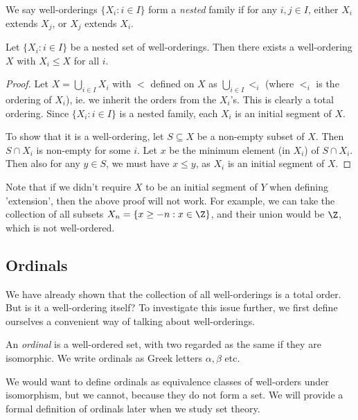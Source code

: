 \documentclass[a4paper]{article}
\begin{document}
\begin{defi}
  We say well-orderings $\{X_i: i\in I\}$ form a \emph{nested} family if for any $i, j\in I$, either $X_i$ extends $X_j$, or $X_j$ extends $X_i$.
\end{defi}

\begin{prop}
  Let $\{X_i: i\in I\}$ be a nested set of well-orderings. Then there exists a well-ordering $X$ with $X_i\leq X$ for all $i$.
\end{prop}

\begin{proof}
  Let $X = \bigcup_{i\in I}X_i$ with $<$ defined on $X$ as $\bigcup_{i\in I} <_i$ (where $<_i$ is the ordering of $X_i$), ie. we inherit the orders from the $X_i$'s. This is clearly a total ordering. Since $\{X_i: i \in I\}$ is a nested family, each $X_i$ is an initial segment of $X$.

  To show that it is a well-ordering, let $S\subseteq X$ be a non-empty subset of $X$. Then $S\cap X_i$ is non-empty for some $i$. Let $x$ be the minimum element (in $X_i$) of $S\cap X_i$. Then also for any $y\in S$, we must have $x \leq y$, as $X_i$ is an initial segment of $X$.
\end{proof}
Note that if we didn't require $X$ to be an initial segment of $Y$ when defining 'extension', then the above proof will not work. For example, we can take the collection of all subsets $X_n = \{x \geq -n: x\in \Z\}$, and their union would be $\Z$, which is not well-ordered.

\subsection{Ordinals}
We have already shown that the collection of all well-orderings is a total order. But is it a well-ordering itself? To investigate this issue further, we first define ourselves a convenient way of talking about well-orderings.

\begin{defi}[Ordinal]
  An \emph{ordinal} is a well-ordered set, with two regarded as the same if they are isomorphic. We write ordinals as Greek letters $\alpha, \beta$ etc.
\end{defi}
We would want to define ordinals as equivalence classes of well-orders under isomorphism, but we cannot, because they do not form a set. We will provide a formal definition of ordinals later when we study set theory.
\end{document}
